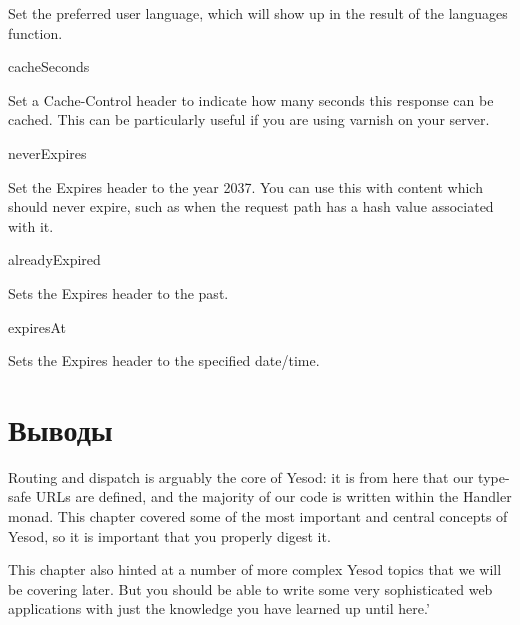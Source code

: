 Set the preferred user language, which will show up in the result of
the languages function.

cacheSeconds

Set a Cache-Control header to indicate how many seconds this response
can be cached. This can be particularly useful if you are using
varnish on your server.

neverExpires

Set the Expires header to the year 2037. You can use this with content
which should never expire, such as when the request path has a hash
value associated with it.

alreadyExpired

Sets the Expires header to the past.

expiresAt

Sets the Expires header to the specified date/time.

\section{Выводы}

Routing and dispatch is arguably the core of Yesod: it is from here
that our type-safe URLs are defined, and the majority of our code is
written within the Handler monad. This chapter covered some of the
most important and central concepts of Yesod, so it is important that
you properly digest it.

This chapter also hinted at a number of more complex Yesod topics that
we will be covering later. But you should be able to write some very
sophisticated web applications with just the knowledge you have
learned up until here.'
